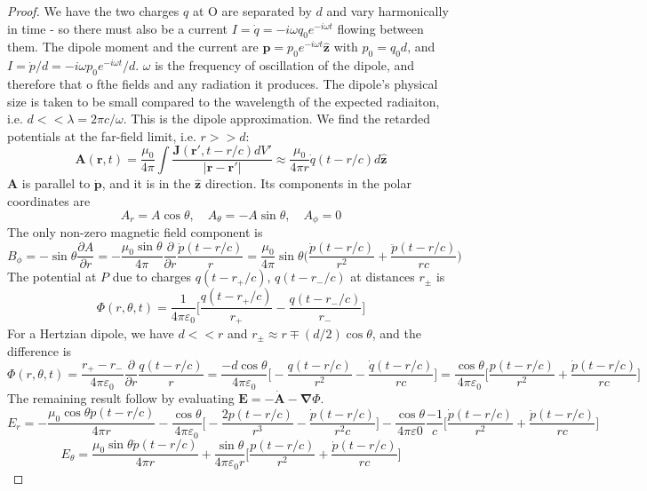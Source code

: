 \documentclass[a4paper]{article}
\theoremstyle{new}
\begin{document}
\begin{proof}
We have the two charges $q$ at O are separated by $d$ and vary harmonically in time  - so there must also be a current $I=\dot{q}=-i\omega q_0e^{-i\omega t}$ flowing between them. The dipole moment and the current are $\mathbf{p}=p_0e^{-i\omega t}\mathbf{\hat{z}}$ with $p_0=q_0d$, and $I=\dot{p}/d=-i\omega p_0e^{-i\omega t}/d$. $\omega$ is the frequency of oscillation of the dipole, and therefore that o fthe fields and any radiation it produces. The dipole's physical size is taken to be small compared to the wavelength of the expected radiaiton, i.e. $d<<\lambda=2\pi c/\omega$. This is the dipole approximation. We find the retarded potentials at the far-field limit, i.e. $r>>d$:
$$\mathbf{A}(\mathbf{r},t)=\frac{\mu_0}{4\pi}\int\frac{\mathbf{J}(\mathbf{r'},t-r/c)dV'}{|\mathbf{r}-\mathbf{r'}|}\approx\frac{\mu_0}{4\pi r}\dot{q}(t-r/c)d\mathbf{\hat{z}}$$
$\mathbf{A}$ is parallel to $\mathbf{\dot{p}}$, and it is in the $\mathbf{\hat{z}}$ direction. Its components in the polar coordinates are
$$A_r=A\cos\theta,\quad A_\theta=-A\sin\theta,\quad A_\phi=0$$
The only non-zero magnetic field component is
$$B_\phi=-\sin\theta\frac{\partial A}{\partial r}=-\frac{\mu_0\sin\theta}{4\pi}\frac{\partial}{\partial r}\frac{\dot{p}(t-r/c)}{r}=\frac{\mu_0}{4\pi}\sin\theta\bigg(\frac{\dot{p}(t-r/c)}{r^2}+\frac{\ddot{p}(t-r/c)}{rc}\bigg)$$
The potential at $P$ due to charges $q(t-r_+/c)$, $q(t-r_-/c)$ at distances $r_\pm$ is
$$\Phi(r,\theta,t)=\frac{1}{4\pi\varepsilon_0}\bigg[\frac{q(t-r_+/c)}{r_+}-\frac{q(t-r_-/c)}{r_-}\bigg]$$
For a Hertzian dipole, we have $d<<r$ and $r_\pm\approx r\mp (d/2)\cos\theta$, and the difference is
$$\Phi(r,\theta,t)=\frac{r_+-r_-}{4\pi\varepsilon_0}\frac{\partial}{\partial r}\frac{q(t-r/c)}{r}=\frac{-d\cos\theta}{4\pi\varepsilon_0}\bigg[-\frac{q(t-r/c)}{r^2}-\frac{\dot{q}(t-r/c)}{rc}\bigg]=\frac{\cos\theta}{4\pi\varepsilon_0}\bigg[\frac{p(t-r/c)}{r^2}+\frac{\dot{p}(t-r/c)}{rc}\bigg]$$
The remaining result follow by evaluating $\mathbf{E}=-\dot{\mathbf{A}}-\boldsymbol{\nabla}\Phi$.
$$E_r=-\frac{\mu_0\cos\theta\ddot{p}(t-r/c)}{4\pi r}-\frac{\cos\theta}{4\pi\varepsilon_0}\bigg[-\frac{2p(t-r/c)}{r^3}-\frac{\dot{p}(t-r/c)}{r^2c}\bigg]-\frac{\cos\theta}{4\pi\varepsilon0}\frac{-1}{c}\bigg[\frac{\dot{p}(t-r/c)}{r^2}+\frac{\ddot{p}(t-r/c)}{rc}\bigg]$$
$$E_\theta=\frac{\mu_0\sin\theta\ddot{p}(t-r/c)}{4\pi r}+\frac{\sin\theta}{4\pi\varepsilon_0 r}\bigg[\frac{p(t-r/c)}{r^2}+\frac{\dot{p}(t-r/c)}{rc}\bigg]$$
\end{proof}
\end{document}
